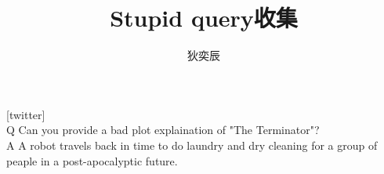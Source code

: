 \documentclass{ctexart}
\title{Stupid query收集}
\author{狄奕辰}
\begin{document}
\maketitle
\paragraph*{}
[twitter]\\
\LARGE Q
\large 
Can you provide a bad plot explaination of "The Terminator"?\\
\LARGE A
\large 
A robot travels back in time to do laundry and dry cleaning 
for a group of peaple in a post-apocalyptic future.\\
\end{document}
